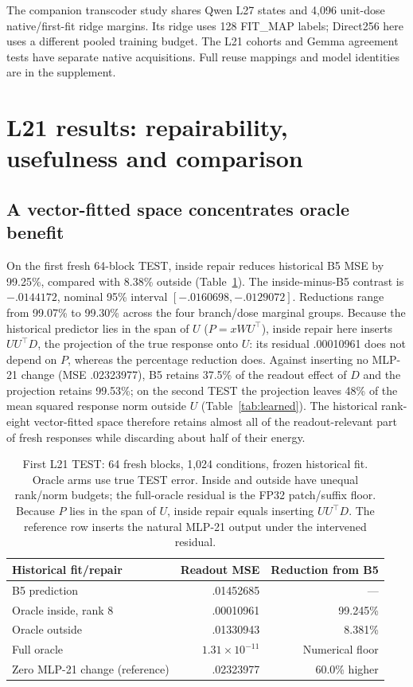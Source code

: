 \documentclass[11pt]{article}
\begin{document}
The companion transcoder study shares Qwen L27 states and 4,096 unit-dose native/first-fit ridge margins. Its ridge uses 128 FIT\_MAP labels; Direct256 here uses a different pooled training budget. The L21 cohorts and Gemma agreement tests have separate native acquisitions. Full reuse mappings and model identities are in the supplement.

\section{L21 results: repairability, usefulness and comparison}
\subsection{A vector-fitted space concentrates oracle benefit}
On the first fresh 64-block TEST, inside repair reduces historical B5 MSE by 99.25\%, compared with 8.38\% outside (Table~\ref{tab:oracle}). The inside-minus-B5 contrast is $-.0144172$, nominal 95\% interval $[-.0160698,-.0129072]$. Reductions range from 99.07\% to 99.30\% across the four branch/dose marginal groups. Because the historical predictor lies in the span of $U$ ($P=xWU^\top$), inside repair here inserts $UU^\top D$, the projection of the true response onto $U$: its residual .00010961 does not depend on $P$, whereas the percentage reduction does. Against inserting no MLP-21 change (MSE .02323977), B5 retains 37.5\% of the readout effect of $D$ and the projection retains 99.53\%; on the second TEST the projection leaves 48\% of the mean squared response norm outside $U$ (Table~\ref{tab:learned}). The historical rank-eight vector-fitted space therefore retains almost all of the readout-relevant part of fresh responses while discarding about half of their energy.

\begin{table}[ht]\centering\small
\begin{tabular}{lrr}\toprule Historical fit/repair & Readout MSE & Reduction from B5\\\midrule
B5 prediction & .01452685 & ---\\
Oracle inside, rank 8 & .00010961 & 99.245\%\\
Oracle outside & .01330943 & 8.381\%\\
Full oracle & $1.31\times10^{-11}$ & Numerical floor\\\midrule
Zero MLP-21 change (reference) & .02323977 & 60.0\% higher\\\bottomrule\end{tabular}
\caption{First L21 TEST: 64 fresh blocks, 1,024 conditions, frozen historical fit. Oracle arms use true TEST error. Inside and outside have unequal rank/norm budgets; the full-oracle residual is the FP32 patch/suffix floor. Because $P$ lies in the span of $U$, inside repair equals inserting $UU^\top D$. The reference row inserts the natural MLP-21 output under the intervened residual.}\label{tab:oracle}
\end{table}
\end{document}
